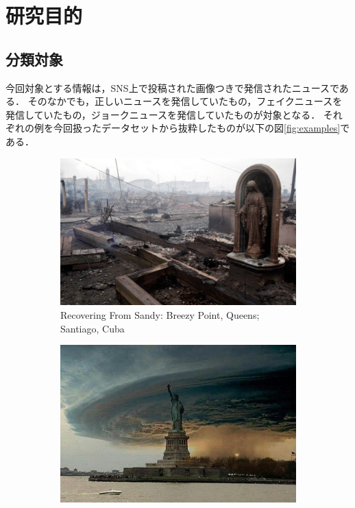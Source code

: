 \chapter{研究目的}
%
\section{分類対象}
今回対象とする情報は，SNS上で投稿された画像つきで発信されたニュースである．
そのなかでも，正しいニュースを発信していたもの，フェイクニュースを発信していたもの，ジョークニュースを発信していたものが対象となる．
それぞれの例を今回扱ったデータセットから抜粋したものが以下の図\ref{fig:examples}である．

\begin{figure}[ht]
    \centering
    \begin{subfigure}[b]{0.45\textwidth}
        \includegraphics[width=\linewidth]{images/real_example.jpg}
        \caption{Recovering From Sandy: Breezy Point, Queens; Santiago, Cuba}
        \label{fig:real}
    \end{subfigure}
    \hfill %
    \begin{subfigure}[b]{0.45\textwidth}
        \includegraphics[width=\linewidth]{images/fake_example.jpg}

\end{subfigure}
\end{figure}
